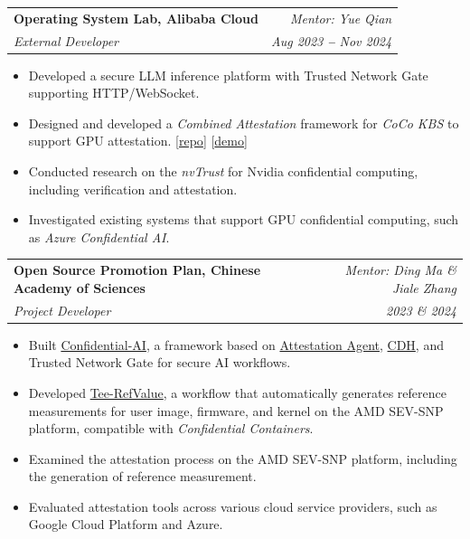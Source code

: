 \documentclass[letterpaper,11pt]{article}
\makeatletter
\newcommand{\resumeItem}[1]{
  \item\small{
    {#1 \vspace{-2pt}}
  }
}
\newcommand{\resumeSubheading}[4]{
  \vspace{-2pt}\item
    \begin{tabular*}{0.97\textwidth}[t]{l@{\extracolsep{\fill}}r}
      \textbf{#1} & #2 \\
      \textit{\small#3} & \textit{\small #4} \\
    \end{tabular*}\vspace{-7pt}
}
\newcommand{\resumeItemListStart}{\begin{itemize}}
\newcommand{\resumeItemListEnd}{\end{itemize}\vspace{-5pt}}
\makeatother
\begin{document}
        \resumeSubheading
      {Operating System Lab, Alibaba Cloud}{\textit{Mentor: Yue Qian}}
      {External Developer}{Aug 2023 \textbf{--} Nov 2024}
        \resumeItemListStart
            \resumeItem{Developed a secure LLM inference platform with Trusted Network Gate supporting HTTP/WebSocket.}
            \resumeItem{Designed and developed a \textit{Combined Attestation} framework for \textit{CoCo KBS} to support GPU attestation. [\href{https://github.com/jingyao-zhang/demo-combined-attestation}{repo}]
            [\href{https://www.youtube.com/watch?v=PUM6HVjNAm8}{demo}]}
            \resumeItem{Conducted research on the \textit{nvTrust} for Nvidia confidential computing, including verification and attestation.}
            \resumeItem{Investigated existing systems that support GPU confidential computing, such as \textit{Azure Confidential AI}.}
        \resumeItemListEnd
    
    \resumeSubheading
      {Open Source Promotion Plan, Chinese Academy of Sciences}{\textit{Mentor: Ding Ma \& Jiale Zhang }}
      {Project Developer}{2023 \& 2024}
        \resumeItemListStart
            \resumeItem{Built \href{https://github.com/inclavare-containers/Confidential-AI}{Confidential-AI}, a framework based on \href{https://github.com/confidential-containers/guest-components/tree/main/attestation-agent}{Attestation Agent}, \href{https://github.com/confidential-containers/guest-components/tree/main/confidential-data-hub}{CDH}, and Trusted Network Gate for secure AI workflows.}
            \resumeItem{Developed \href{https://github.com/inclavare-containers/tee-refvalue}{Tee-RefValue}, a workflow that automatically generates reference measurements for user image, firmware, and kernel on the AMD SEV-SNP platform, compatible with \textit{Confidential Containers}.}
            \resumeItem{Examined the attestation process on the AMD SEV-SNP platform, including the generation of reference measurement.}
            \resumeItem{Evaluated attestation tools across various cloud service providers, such as Google Cloud Platform and Azure.}
        \resumeItemListEnd
    
\end{document}
